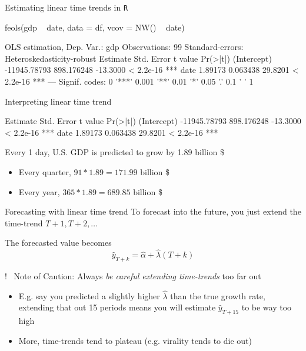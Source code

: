 \documentclass[aspectratio=169,t,11pt,table]{beamer}
\begin{document}
\begin{frame}[fragile]{Estimating linear time trends in \texttt{R}}

  \begin{codeblock}
feols(gdp ~ date, data = df, vcov = NW() ~ date)
  \end{codeblock}

  \medskip
  \begin{codeblock}[{}]
OLS estimation, Dep. Var.: gdp
Observations: 99
Standard-errors: Heteroskedasticity-robust 
                Estimate Std. Error  t value  Pr(>|t|)    
(Intercept) -11945.78793 898.176248 -13.3000 < 2.2e-16 ***
date             1.89173   0.063438  29.8201 < 2.2e-16 ***
---
Signif. codes:  0 '***' 0.001 '**' 0.01 '*' 0.05 '.' 0.1 ' ' 1
  \end{codeblock}
\end{frame}

\begin{frame}[fragile]{Interpreting linear time trend}
  \vspace*{-\bigskipamount}
  \begin{codeblock}[{}]
                Estimate Std. Error  t value  Pr(>|t|)    
(Intercept) -11945.78793 898.176248 -13.3000 < 2.2e-16 ***
date             1.89173   0.063438  29.8201 < 2.2e-16 ***
  \end{codeblock}

  \bigskip
  Every 1 day, U.S. GDP is predicted to grow by 1.89 billion \$ 
  \begin{itemize}
    \item Every quarter, $91 * 1.89 = 171.99$ billion \$

    \item Every year, $365 * 1.89 = 689.85$ billion \$
  \end{itemize}
\end{frame}

\begin{frame}{Forecasting with linear time trend}
  To forecast into the future, you just extend the time-trend $T+1, T+2, \dots$
  
  \bigskip
  The forecasted value becomes 
  $$
    \hat{y}_{T+k} = \hat{\alpha} + \hat{\lambda} (T+k)
  $$

  \pause
  \begin{tcolorbox}[boxrule = 0pt, frame hidden, sharp corners, enhanced, borderline west = {4pt}{0pt}{yellow}, interior hidden]
    {\color{yellow}\Large $!$\ } Note of Caution: Always \emph{be careful extending time-trends} too far out
  \end{tcolorbox}

  \begin{itemize}
    \item E.g. say you predicted a slightly higher $\hat{\lambda}$ than the true growth rate, extending that out 15 periods means you will estimate $\hat{y}_{T + 15}$ to be way too high
  
    \smallskip
    \item More, time-trends tend to plateau (e.g. virality tends to die out)
  \end{itemize}
\end{frame}
\end{document}
